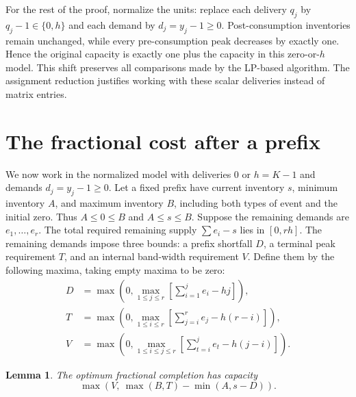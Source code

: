 \documentclass[11pt]{article}
\newtheorem{lemma}{Lemma}
\begin{document}
For the rest of the proof, normalize the units: replace each delivery $q_j$ by
$q_j-1\in\{0,h\}$ and each demand by $d_j=y_j-1\ge0$. Post-consumption
inventories remain unchanged, while every pre-consumption peak decreases
by exactly one. Hence the original capacity is exactly one plus the capacity
in this zero-or-$h$ model. This shift preserves all comparisons made
by the LP-based algorithm. The assignment reduction justifies
working with these scalar deliveries instead of matrix entries.

\section{The fractional cost after a prefix}\label{sec:prefix}
We now work in the normalized model with deliveries $0$ or $h=K-1$ and
demands $d_j=y_j-1\ge0$. Let a fixed prefix have current inventory $s$,
minimum inventory $A$, and maximum inventory $B$, including both types of
event and the initial zero. Thus $A\le0\le B$ and $A\le s\le B$.
Suppose the remaining demands are $e_1,\ldots,e_r$. The total required
remaining supply $\sum e_i-s$ lies in $[0,rh]$.
The remaining demands impose three bounds: a prefix shortfall $D$, a
terminal peak requirement $T$, and an internal band-width requirement $V$.
Define them by the following maxima, taking empty maxima to be zero:
\begin{align*}
D&=\max\left(0,\max_{1\le j\le r}\left[\sum_{i=1}^j e_i-hj\right]\right),\\
T&=\max\left(0,\max_{1\le i\le r}\left[\sum_{j=i}^r e_j-h(r-i)\right]\right),\\
V&=\max\left(0,\max_{1\le i\le j\le r}
             \left[\sum_{t=i}^j e_t-h(j-i)\right]\right).
\end{align*}
\begin{lemma}\label{lem:prefix}
The optimum fractional completion has capacity
\[
\max\left(V,\ \max(B,T)-\min(A,s-D)\right).
\]
\end{lemma}
\end{document}
